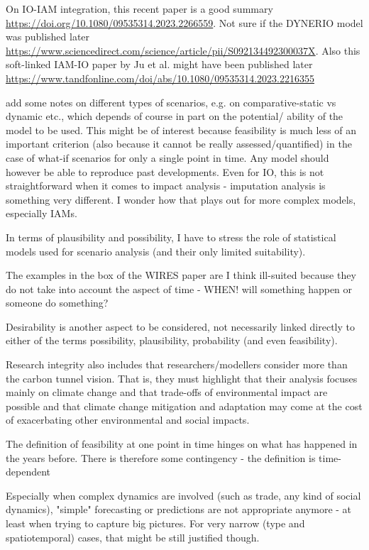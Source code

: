 \documentclass{article}
\begin{document}
On IO-IAM integration, this recent paper is a good summary \url{https://doi.org/10.1080/09535314.2023.2266559}. Not sure if the DYNERIO model was published later \url{https://www.sciencedirect.com/science/article/pii/S092134492300037X}. Also this soft-linked IAM-IO paper by Ju et al. might have been published later \url{https://www.tandfonline.com/doi/abs/10.1080/09535314.2023.2216355}

add some notes on different types of scenarios, e.g. on comparative-static vs dynamic etc., which depends of course in part on the potential/ ability of the model to be used. This might be of interest because feasibility is much less of an important criterion (also because it cannot be really assessed/quantified) in the case of what-if scenarios for only a single point in time. Any model should however be able to reproduce past developments. Even for IO, this is not straightforward when it comes to impact analysis - imputation analysis is something very different. I wonder how that plays out for more complex models, especially IAMs.

In terms of plausibility and possibility, I have to stress the role of statistical models used for scenario analysis (and their only limited suitability).

The examples in the box of the WIRES paper are I think ill-suited because they do not take into account the aspect of time - WHEN! will something happen or someone do something?

Desirability is another aspect to be considered, not necessarily linked directly to either of the terms possibility, plausibility, probability (and even feasibility).

Research integrity also includes that researchers/modellers consider more than the carbon tunnel vision. That is, they must highlight that their analysis focuses mainly on climate change and that trade-offs of environmental impact are possible and that climate change mitigation and adaptation may come at the cost of exacerbating other environmental and social impacts.

The definition of feasibility at one point in time hinges on what has happened in the years before. There is therefore some contingency - the definition is time-dependent

Especially when complex dynamics are involved (such as trade, any kind of social dynamics), "simple" forecasting or predictions are not appropriate anymore - at least when trying to capture big pictures. For very narrow (type and spatiotemporal) cases, that might be still justified though.
\end{document}
